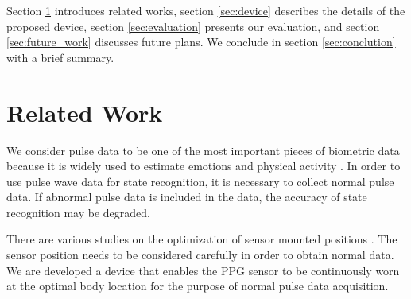 \documentclass[sigconf]{acmart}
\begin{document}

Section \ref{sec:related} introduces related works, section \ref{sec:device} describes the details of the proposed device, section \ref{sec:evaluation} presents our evaluation, and section \ref{sec:future_work} discusses future plans. We conclude in section \ref{sec:conclution} with a brief summary.



\section{Related Work}
\label{sec:related}
We consider pulse data to be one of the most important pieces of biometric data because it is widely used to estimate emotions and physical activity \cite{emotion_recognition_zhu, emotion_recognition_rinella, stress_detection, respiration_rate_estimation_selvakumar, respiratory_rate_estimation1, respiratory_rate_estimation2}.
In order to use pulse wave data for state recognition, it is necessary to collect normal pulse data. If abnormal pulse data is included in the data, the accuracy of state recognition may be degraded.\par

There are various studies on the optimization of sensor mounted positions \cite{sensor_placement_xu, sensor_placement_otim, sensor_placement_davoudi, sensor_placement_banos, sensor_placement_xia}.
The sensor position needs to be considered carefully in order to obtain normal data. We are developed a device that enables the PPG sensor to be continuously worn at the optimal body location for the purpose of normal pulse data acquisition.
\end{document}
